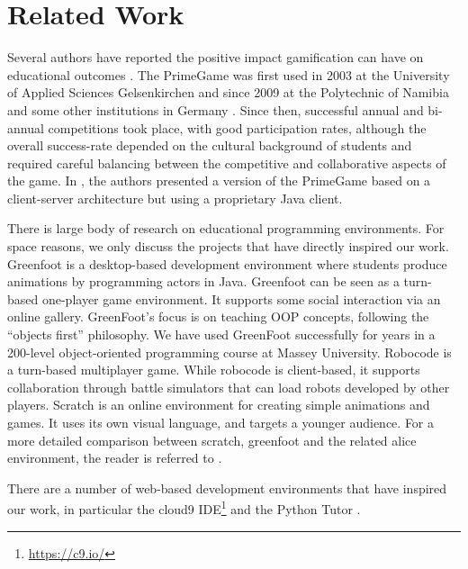 \section{Related Work}

Several authors have reported the positive impact gamification can have on educational outcomes \cite{muratet2009towards,rankin2008impact,wang2009application}. The PrimeGame was first used in 2003 at the University of Applied Sciences Gelsenkirchen and since 2009 at the Polytechnic of Namibia and some other institutions in Germany \cite{meyer2010primegame}. Since then, successful annual and bi-annual competitions took place, with good participation rates, although the overall success-rate depended on the cultural background of students and required careful balancing between the competitive and collaborative aspects of the game. In \cite{meyer2011primegame}, the authors presented a version of the PrimeGame based on a client-server architecture but using a proprietary Java client.

There is large body of research on educational programming environments. For space reasons, we only discuss the projects that have directly inspired our work. Greenfoot \cite{henriksen2004greenfoot} is a desktop-based development environment where students produce animations by programming actors in Java. Greenfoot can be seen as a turn-based one-player game environment. It supports some social interaction via an online gallery. GreenFoot's focus is on teaching OOP concepts, following the ``objects first'' philosophy. We have used GreenFoot successfully for years in a 200-level object-oriented programming course at Massey University. Robocode \cite{nelson2001robocode} is a turn-based multiplayer game. While robocode is client-based, it supports collaboration through battle simulators that can load robots developed by other players.  Scratch \cite{resnick2009scratch} is an online environment for creating simple animations and games. It uses its own visual language, and targets a younger audience. For a more detailed comparison between scratch, greenfoot and the related alice environment, the reader is referred to \cite{utting2010alice}.

There are a number of web-based development environments that have inspired our work, in particular the cloud9 IDE\footnote{\url{https://c9.io/}} and the Python Tutor \cite{GuoSIGCSE2013}. 

